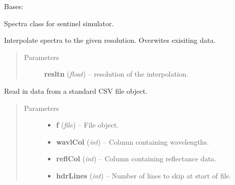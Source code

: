 \documentclass[letterpaper,10pt,english]{sphinxmanual}
\begin{document}
\begin{fulllineitems}
\label{source/sentinel_simulator:sentinel_simulator.spectra.spectra}
Bases: 

Spectra class for sentinel simulator.

\begin{fulllineitems}
\label{source/sentinel_simulator:sentinel_simulator.spectra.spectra.interpolate}
Interpolate spectra to the given resolution.
Overwites exisiting data.
\begin{quote}\begin{description}
\item[{Parameters}] \leavevmode
\textbf{resltn} (\emph{float}) -- resolution of the interpolation.

\end{description}\end{quote}

\end{fulllineitems}


\begin{fulllineitems}
\label{source/sentinel_simulator:sentinel_simulator.spectra.spectra.loadCSV}
Read in data from a standard CSV file object.
\begin{quote}\begin{description}
\item[{Parameters}] \leavevmode\begin{itemize}
\item {} 
\textbf{f} (\emph{file}) -- File object.

\item {} 
\textbf{wavlCol} (\emph{int}) -- Column containing wavelengths.

\item {} 
\textbf{reflCol} (\emph{int}) -- Column containing reflectance data.

\item {} 
\textbf{hdrLines} (\emph{int}) -- Number of lines to skip at start of file.


\end{itemize}
\end{description}
\end{quote}
\end{fulllineitems}
\end{fulllineitems}
\end{document}
